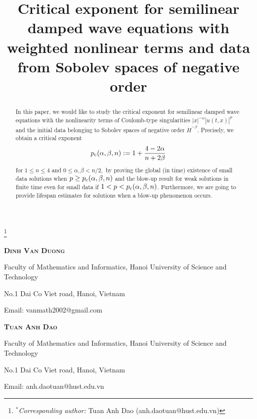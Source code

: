 \documentclass[11pt,reqno]{amsart}
\begin{document}
\title[Weighted semilinear damped wave equations]{Critical exponent for semilinear damped wave equations with weighted
nonlinear terms and data from Sobolev spaces of negative
order}

\thanks{$^* $\textit{Corresponding author:} Tuan Anh Dao (anh.daotuan@hust.edu.vn)}

\maketitle

\centerline{\scshape \textbf{Dinh Van Duong}}
{\footnotesize
	\centerline{Faculty of Mathematics and Informatics, Hanoi University of Science and Technology}
	\centerline{No.1 Dai Co Viet road, Hanoi, Vietnam}
	\centerline{Email: vanmath2002@gmail.com}}
\medskip

\centerline{\scshape \textbf{Tuan Anh Dao}}
{\footnotesize
	\centerline{Faculty of Mathematics and Informatics, Hanoi University of Science and Technology}
	\centerline{No.1 Dai Co Viet road, Hanoi, Vietnam}
	\centerline{Email: anh.daotuan@hust.edu.vn}}



\begin{abstract}
   In this paper, we would like to study the critical exponent for semilinear damped wave equations with the nonlinearity terms of Coulomb-type singularities $|x|^{-\alpha} |u(t,x)|^p$  and the initial data belonging to Sobolev spaces of negative order $\dot{H}^{-\beta}$. Precisely, we obtain a critical exponent
$$p_{\rm c}(\alpha,\beta,n): = 1 + \frac{4-2\alpha}{n+2\beta} $$
for $1 \leq n \leq 4$ and $ 0 \leq \alpha, \beta < n/2,$ by proving the global (in time) existence of small data solutions when $p \geq p_{\rm c}(\alpha,\beta,n)$ and the blow-up result for weak solutions in finite time even for small data if $1 < p < p_{\rm c}(\alpha,\beta,n)$. Furthermore, we are going to provide lifespan estimates for solutions when a blow-up phenomenon occurs.
\end{abstract}

\tableofcontents


\end{document}
